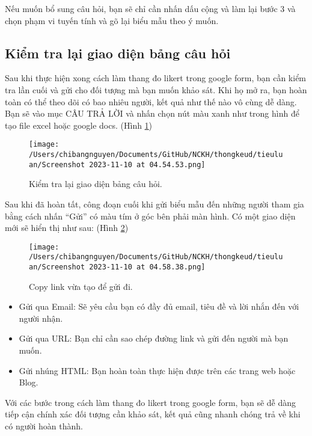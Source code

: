 \documentclass[12pt]{article}
\begin{document}
Nếu muốn bổ sung câu hỏi, bạn sẽ chỉ cần nhấn dấu cộng và làm lại bước 3 và chọn phạm vi tuyến tính và gõ lại biểu mẫu theo ý muốn. 

\vspace{1cm}

\subsection{Kiểm tra lại giao diện bảng câu hỏi}

\vspace{.5cm}

Sau khi thực hiện xong cách làm thang đo likert trong google form, bạn cần kiểm tra lần cuối và gửi cho đối tượng mà bạn muốn khảo sát. Khi họ mở ra, bạn hoàn toàn có thể theo dõi có bao nhiêu người, kết quả như thế nào vô cùng dễ dàng. Bạn sẽ vào mục CÂU TRẢ LỜI và nhấn chọn nút màu xanh như trong hình để tạo file excel hoặc google docs. (Hình \ref{5})

\begin{figure}
    \centering
    \texttt{[image: /Users/chibangnguyen/Documents/GitHub/NCKH/thongkeud/tieuluan/Screenshot 2023-11-10 at 04.54.53.png]}
    \caption{Kiểm tra lại giao diện bảng câu hỏi.}
    \label{5}
\end{figure}

Sau khi đã hoàn tất, công đoạn cuối khi gửi biểu mẫu đến những người tham gia bằng cách nhấn “Gửi” có màu tím ở góc bên phải màn hình. Có một giao diện mới sẽ hiển thị như sau: (Hình \ref{6})

\begin{figure}
    \centering
    \texttt{[image: /Users/chibangnguyen/Documents/GitHub/NCKH/thongkeud/tieuluan/Screenshot 2023-11-10 at 04.58.38.png]}
    \caption{Copy link vừa tạo để gửi đi.}
    \label{6}
\end{figure}

\begin{itemize}
\item Gửi qua Email: Sẽ yêu cầu bạn có đầy đủ email, tiêu đề và lời nhắn đến với người nhận. 
\item Gửi qua URL: Bạn chỉ cần sao chép đường link và gửi đến người mà bạn muốn.
\item Gửi nhúng HTML: Bạn hoàn toàn thực hiện được trên các trang web hoặc Blog. 
\end{itemize}

Với các bước trong cách làm thang đo likert trong google form, bạn sẽ dễ dàng tiếp cận chính xác đối tượng cần khảo sát, kết quả cũng nhanh chóng trả về khi có người hoàn thành.
\end{document}
